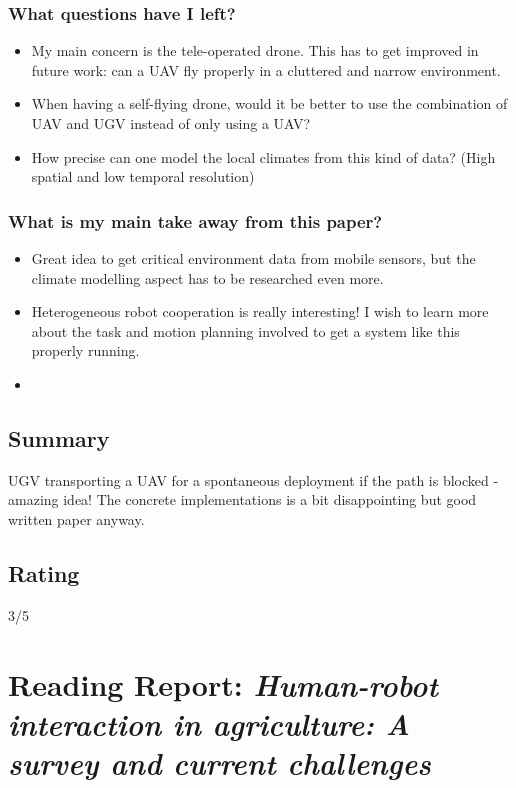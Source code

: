     \subsubsection*{What questions have I left?}
    \begin{itemize}
        \item My main concern is the tele-operated drone. This has to get improved in future work: can a UAV fly properly in a cluttered and narrow environment.
        \item When having a self-flying drone, would it be better to use the combination of UAV and UGV instead of only using a UAV?
        \item How precise can one model the local climates from this kind of data? (High spatial and low temporal resolution)
    \end{itemize}
    \subsubsection*{What is my main take away from this paper?}
    \begin{itemize}
        \item Great idea to get critical environment data from mobile sensors, but the climate modelling aspect has to be researched even more.
        \item Heterogeneous robot cooperation is really interesting! I wish to learn more about the task and motion planning involved to get a system like this properly running.
        \item 
    \end{itemize}
    
    \subsection*{Summary}
    UGV transporting a UAV for a spontaneous deployment if the path is blocked - amazing idea! The concrete implementations is a bit disappointing but good written paper anyway.
    
    \subsection*{Rating}
    3/5
    
    \newpage
    \section{Reading Report: \emph{Human-robot interaction in agriculture: A survey and current challenges}}
    \cite{Vasconez2019}
    
